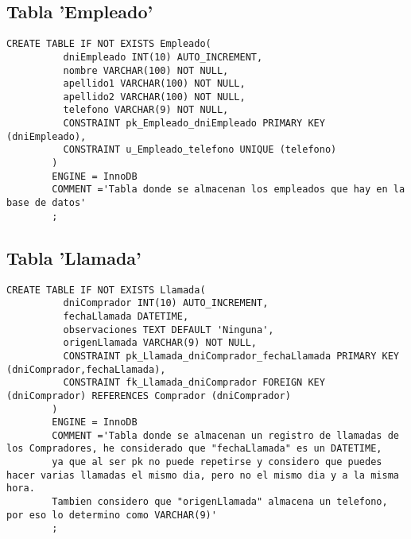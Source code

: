 \documentclass{article}
\begin{document}
  \newpage
    \subsection{Tabla 'Empleado'}
      \begin{lstlisting}[style=C]
        CREATE TABLE IF NOT EXISTS Empleado(
          dniEmpleado INT(10) AUTO_INCREMENT,
          nombre VARCHAR(100) NOT NULL,
          apellido1 VARCHAR(100) NOT NULL,
          apellido2 VARCHAR(100) NOT NULL,
          telefono VARCHAR(9) NOT NULL,
          CONSTRAINT pk_Empleado_dniEmpleado PRIMARY KEY (dniEmpleado),
          CONSTRAINT u_Empleado_telefono UNIQUE (telefono)
        )
        ENGINE = InnoDB
        COMMENT ='Tabla donde se almacenan los empleados que hay en la base de datos'
        ;
      \end{lstlisting}

    \subsection{Tabla 'Llamada'}
      \begin{lstlisting}[style=C]
        CREATE TABLE IF NOT EXISTS Llamada(
          dniComprador INT(10) AUTO_INCREMENT,
          fechaLlamada DATETIME,
          observaciones TEXT DEFAULT 'Ninguna',
          origenLlamada VARCHAR(9) NOT NULL,
          CONSTRAINT pk_Llamada_dniComprador_fechaLlamada PRIMARY KEY (dniComprador,fechaLlamada),
          CONSTRAINT fk_Llamada_dniComprador FOREIGN KEY (dniComprador) REFERENCES Comprador (dniComprador)
        )
        ENGINE = InnoDB
        COMMENT ='Tabla donde se almacenan un registro de llamadas de los Compradores, he considerado que "fechaLlamada" es un DATETIME, 
        ya que al ser pk no puede repetirse y considero que puedes hacer varias llamadas el mismo dia, pero no el mismo dia y a la misma hora.
        Tambien considero que "origenLlamada" almacena un telefono, por eso lo determino como VARCHAR(9)'
        ;
      \end{lstlisting}

  \newpage
\end{document}
